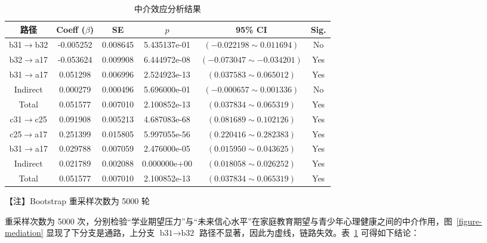 \documentclass[zihao = -4, linespread = 1.5]{article}
\begin{document}
\begin{table}[htbp]
    \centering
    \setlength{\tabcolsep}{7pt}
    \renewcommand{\arraystretch}{1.5}
    \caption{中介效应分析结果}\label{table-mediation}
    \begin{threeparttable}
            \begin{tabular}{cccccc}
                \bottomrule[1.5pt]
                \textbf{路径} & Coeff ($\beta$) & SE & $p$ & 95\% CI & Sig. \\
                \midrule[0.75pt]
                b31$\to$b32 & -0.005252 & 0.008645 & 5.435137e-01 & $(-0.022198\sim0.011694)$ & No \\
                b32$\to$a17 & -0.053624 & 0.009908 & 6.444972e-08 & $(-0.073047\sim-0.034201)$ & Yes \\
                b31$\to$a17 & 0.051298 & 0.006996 & 2.524923e-13 & $(0.037583\sim0.065012)$ & Yes \\
                Indirect & 0.000279 & 0.000496 & 5.696000e-01 & $(-0.000657\sim0.001336)$ & No \\
                Total & 0.051577 & 0.007010 & 2.100852e-13 & $(0.037834\sim0.065319)$ & Yes \\
                \addlinespace
                c31$\to$c25 & 0.091908 & 0.005213 & 4.687083e-68 & $(0.081689\sim0.102126)$ & Yes \\
                c25$\to$a17 & 0.251399 & 0.015805 & 5.997055e-56 & $(0.220416\sim0.282383)$ & Yes \\
                b31$\to$a17 & 0.029788 & 0.007059 & 2.476000e-05 & $(0.015950\sim0.043625)$ & Yes \\
                Indirect & 0.021789 & 0.002088 & 0.000000e+00 & $(0.018058\sim0.026252)$ & Yes \\
                Total & 0.051577 & 0.007010 & 2.100852e-13 & $(0.037834\sim0.065319)$ & Yes \\
                \toprule[1.5pt]
            \end{tabular}
        \begin{tablenotes}\small
            \item 【注】Bootstrap 重采样次数为 5000 轮
        \end{tablenotes}
    \end{threeparttable}
\end{table}

重采样次数为 5000 次，分别检验“学业期望压力”与“未来信心水平”在家庭教育期望与青少年心理健康之间的中介作用，图~\ref{figure-mediation} 显现了下分支是通路，上分支 $\text{b31}\to\text{b32}$ 路径不显著，因此为虚线，链路失效。表~\ref{table-mediation} 可得如下结论：
\end{document}
